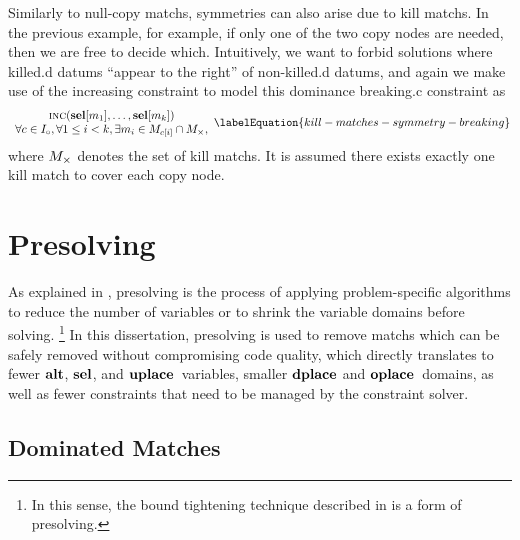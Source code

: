Similarly to \glspl{null-copy match}, symmetries can also arise due to
\glspl{kill match}.
%
In the previous example, for example, if only one of the two \glspl{copy node}
are needed, then we are free to decide which.
%
Intuitively, we want to forbid \glspl{solution} where \gls{killed.d}
\glspl{datum} ``appear to the right'' of non-\gls{killed.d} \glspl{datum}, and
again we make use of the \gls{increasing constraint} to model this
\gls{dominance breaking.c} \gls{constraint} as
%
\begin{equation}
  \begin{array}{c}
    \mIncreasing(\mVar{sel}[m_1], \ldots, \mVar{sel}[m_k]) \\
    \forall c \in \mInterchDataSet[\mCopy],
    \forall 1 \leq i < k,
    \exists m_i \in \mMatchSet[c[i]] \cap \mKillMatchSet,
  \end{array}
  \labelEquation{kill-matches-symmetry-breaking}
\end{equation}
%
where $\mKillMatchSet$ denotes the set of \glspl{kill match}.
%
It is assumed there exists exactly one \gls{kill match} to cover each \gls{copy
  node}.


\section{Presolving}

As explained in , \gls{presolving} is the
process of applying problem-specific algorithms to reduce the number of
\glspl{variable} or to shrink the \gls{variable} \glspl{domain} before
solving.\!%
%
\footnote{%
  In this sense, the bound tightening technique described in
   is a form of \gls{presolving}.%
}
%
In this dissertation, \gls{presolving} is used to remove \glspl{match} which can
be safely removed without compromising code quality, which directly translates
to fewer $\mVar{alt}$, $\mVar{sel}$, and $\mVar{uplace}$~\glspl{variable},
smaller $\mVar{dplace}$ and $\mVar{oplace}$~\glspl{domain}, as well as fewer
\glspl{constraint} that need to be managed by the \gls{constraint solver}.


\subsection{Dominated Matches}

